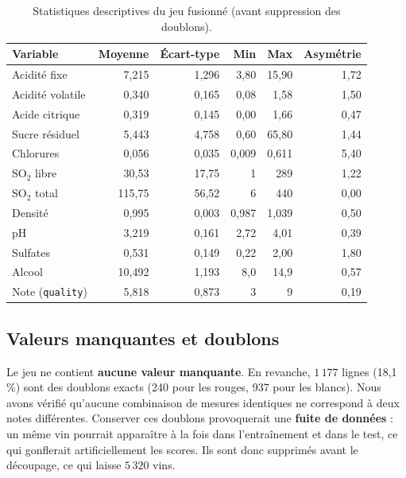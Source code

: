 \documentclass[11pt,a4paper]{article}
\begin{document}
\begin{table}[htbp]
\centering\small
\caption{Statistiques descriptives du jeu fusionné (avant suppression des doublons).}\label{tab:desc}
\begin{tabular}{@{}lrrrrr@{}}
\toprule
Variable & Moyenne & Écart-type & Min & Max & Asymétrie \\
\midrule
Acidité fixe              & 7,215   & 1,296  & 3,80  & 15,90  & 1,72 \\
Acidité volatile          & 0,340   & 0,165  & 0,08  & 1,58   & 1,50 \\
Acide citrique            & 0,319   & 0,145  & 0,00  & 1,66   & 0,47 \\
Sucre résiduel            & 5,443   & 4,758  & 0,60  & 65,80  & 1,44 \\
Chlorures                 & 0,056   & 0,035  & 0,009 & 0,611  & 5,40 \\
SO$_2$ libre              & 30,53   & 17,75  & 1     & 289    & 1,22 \\
SO$_2$ total              & 115,75  & 56,52  & 6     & 440    & 0,00 \\
Densité                   & 0,995   & 0,003  & 0,987 & 1,039  & 0,50 \\
pH                        & 3,219   & 0,161  & 2,72  & 4,01   & 0,39 \\
Sulfates                  & 0,531   & 0,149  & 0,22  & 2,00   & 1,80 \\
Alcool                    & 10,492  & 1,193  & 8,0   & 14,9   & 0,57 \\
\midrule
Note (\texttt{quality})   & 5,818   & 0,873  & 3     & 9      & 0,19 \\
\bottomrule
\end{tabular}
\end{table}

\subsection{Valeurs manquantes et doublons}

Le jeu ne contient \textbf{aucune valeur manquante}. En revanche, $1\,177$ lignes (18,1\,\%) sont des doublons exacts (240 pour les rouges, 937 pour les blancs).
Nous avons vérifié qu'aucune combinaison de mesures identiques ne correspond à deux notes différentes. Conserver ces doublons provoquerait une
\textbf{fuite de données} : un même vin pourrait apparaître à la fois dans l'entraînement et dans le test, ce qui gonflerait artificiellement les scores. Ils sont donc
supprimés avant le découpage, ce qui laisse $5\,320$ vins.
\end{document}
